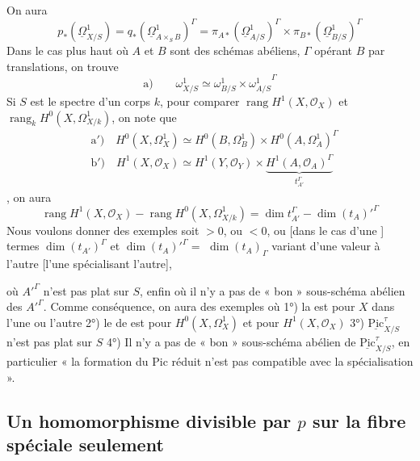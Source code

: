 \documentclass[11pt,a4paper]{article}
\begin{document}
On aura
\[
p_*(\underline{\Omega}^1_{X/S}) = q_*(\underline{\Omega}^1_{A \times_S B})^{\Gamma} = \pi_{A*}(\underline{\Omega}^1_{A/S})^{\Gamma} \times \pi_{B*}(\underline{\Omega}^1_{B/S})^{\Gamma}
\]
Dans le cas plus haut où $A$ et $B$ sont des schémas abéliens,  $\Gamma$ opérant  $B$ par translations, on trouve
\[
\text{a)}\qquad \omega^1_{X/S} \simeq \omega^1_{B/S} \times {\omega^1_{A/S}}^{\Gamma}
\]
Si $S$ est le spectre d'un corps $k$, pour comparer \struck{\ill{}} $\operatorname{rang} H^1(X, \mathcal{O}_X)$ et \struck{\ill{}} $\operatorname{rang}_k H^0(X, \Omega^1_{X/k})$, on note  que \ill{} \ill{} \ill{}  
\[
\begin{aligned}
&\text{a}')\quad H^0(X, \Omega^1_X) \simeq H^0(B, \Omega^1_B) \times H^0(A, \Omega^1_A)^{\Gamma} \\
&\text{b}')\quad H^1(X, \mathcal{O}_X) \simeq H^1(Y, \mathcal{O}_Y) \times \underbrace{H^1(A, \mathcal{O}_A)^{\Gamma}}_{t_{A'}^{\Gamma}}
\end{aligned}
\]
  \ill{} \ill{} \ill{}, on aura
\[
\operatorname{rang} H^1(X, \mathcal{O}_X) - \operatorname{rang} H^0(X, \Omega^1_{X/k}) = \dim t_{A'}^{\Gamma} - \dim (t_A)'^{\Gamma}
\]
Nous voulons donner des exemples    soit $>0$, ou $<0$,  ou \ill{} [dans le cas d'une ]   termes $\dim (t_{A'})^{\Gamma}$ et $\dim (t_A)'^{\Gamma} =$ \struck{$\dim$} $\dim (t_A)_{\Gamma}$ variant d'une valeur   à l'autre \struck{[\ill{}} [l'une spécialisant l'autre],

où $A'^{\Gamma}$ n'est pas plat sur $S$, enfin où il n'y a pas de « bon » sous-schéma abélien des $A'^{\Gamma}$. Comme conséquence, on aura des exemples où 1°) la  est  pour $X$ dans l'une ou l'autre  2°) le  de  est  pour $H^0(X, \Omega^1_X)$ et pour $H^1(X, \mathcal{O}_X)$ 3°) $\underline{\mathrm{Pic}}^{\tau}_{X/S}$ n'est pas plat sur $S$ 4°) Il n'y a pas de « bon » sous-schéma abélien de $\underline{\mathrm{Pic}}^{\tau}_{X/S}$, en particulier « la formation du $\mathrm{Pic}$ réduit n'est pas compatible avec la spécialisation ».

\subsection{Un homomorphisme divisible par $p$ sur la fibre spéciale seulement}
\end{document}
